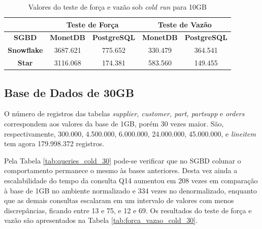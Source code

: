 \begin{table}[htpb]
        \centering
        \caption{Valores do teste de força e vazão sob \textit{cold run} para 10GB}
        \label{tab:forca_vazao_cold_10}
        \begin{tabular}{|c|c|c|c|c|} 
                \cline{2-5}
                \multicolumn{1}{c|}{} & \multicolumn{2}{c|}{\textbf{Teste de Força} } & \multicolumn{2}{c|}{\textbf{Teste de Vazão} }  \\ 
                \hline
                        \textbf{SGBD}        & \textbf{MonetDB}  & \textbf{PostgreSQL}       & \textbf{MonetDB}  & \textbf{PostgreSQL}        \\ 
                \hline
                        \textbf{Snowflake}   & 3687.621          & 775.652                   & 330.479           & 364.541                    \\ 
                \hline
                        \textbf{Star}        & 3116.068          & 174.381                   & 583.560           & 149.455                    \\
                \hline
                \end{tabular}
                \end{table}
                
\subsection{Base de Dados de 30GB}

O número de registros das tabelas \textit{supplier, customer, part, partsupp} e \textit{orders} correspondem aos valores da base de 1GB, porém 30 vezes maior. São, respectivamente, 300.000, 4.500.000, 6.000.000, 24.000.000, 45.000.000, e \textit{lineitem} tem agora 179.998.372 registros.

Pela Tabela \ref{tab:queries_cold_30} pode-se verificar que no SGBD colunar o comportamento permanece o mesmo às bases anteriores. Desta vez ainda a escalabilidade do tempo da consulta Q14 aumentou em 208 vezes em comparação à base de 1GB no ambiente normalizado e 334 vezes no denormalizado, enquanto que as demais consultas escalaram em um intervalo de valores com menos discrepâncias, ficando entre 13 e 75, e 12 e 69. Os resultados do teste de força e vazão são apresentados na Tabela \ref{tab:forca_vazao_cold_30}.

